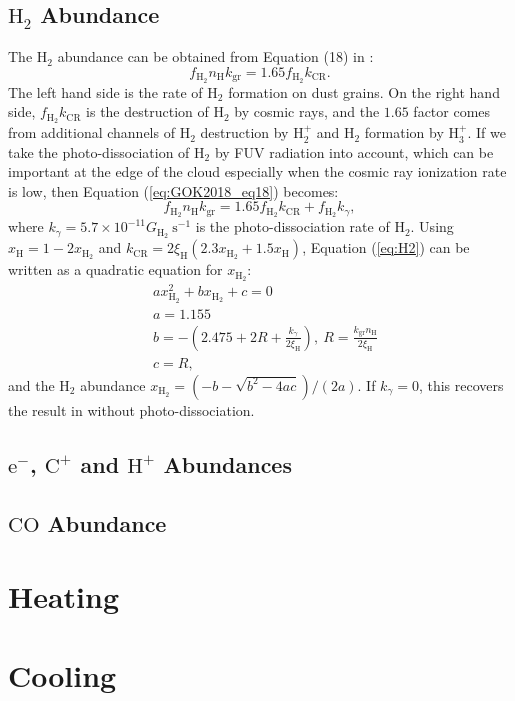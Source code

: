 \documentclass[iop,numberedappendix]{emulateapj}
\newcommand{\mr}{\mathrm}
\newcommand{\Ht}{\mathrm{H_2}}
\newcommand{\Ho}{\mathrm{H}}
\newcommand{\Hplus}{\mathrm{H^+}}
\newcommand{\CO}{\mathrm{CO}}
\newcommand{\Cplus}{\mathrm{C^+}}
\begin{document}
\subsection{$\Ht$ Abundance\label{section:H2}}
The $\Ht$ abundance can be obtained from Equation (18) in \citet{GOK2018}:
\begin{equation}\label{eq:GOK2018_eq18}
    f_\Ht n_\Ho k_\mr{gr} = 1.65 f_\Ht k_\mr{CR}.
\end{equation}
The left hand side is the rate of $\Ht$ formation on dust grains. On the right
hand side, $f_\Ht k_\mr{CR}$ is the destruction of $\Ht$ by cosmic rays, and
the $1.65$ factor comes from additional channels of $\Ht$ destruction by
$\mr{H_2^+}$ and $\Ht$ formation by $\mr{H_3^+}$. If we take the
photo-dissociation of $\Ht$ by FUV radiation into account, which can be
important at the edge of the cloud especially when the cosmic ray ionization
rate is low, then Equation (\ref{eq:GOK2018_eq18}) becomes:
\begin{equation}\label{eq:H2}
    f_\Ht n_\Ho k_\mr{gr} = 1.65 f_\Ht k_\mr{CR} + f_\Ht k_\gamma,
\end{equation}
where $k_\gamma=5.7\times 10^{-11}G_\Ht~\mr{s^{-1}}$ is the photo-dissociation
rate of $\Ht$. Using $x_\Ho = 1-2x_\Ht$ and
$k_\mr{CR}=2\xi_\Ho(2.3x_\Ht+1.5x_\Ho)$, Equation (\ref{eq:H2}) can be written
as a quadratic equation for $x_\Ht$:
\begin{align}
    &a x_\Ht^2 + bx_\Ht + c = 0\\
    &a = 1.155\\
    &b=- (2.475 + 2R + \frac{k_\gamma}{2\xi_\Ho}),
    ~R=\frac{k_\mr{gr}n_\Ho}{2\xi_\Ho}\\
    &c=R,
\end{align}
and the $\Ht$ abundance $x_\Ht=(-b - \sqrt{b^2 - 4ac} )/(2a)$. If $k_\gamma=0$,
this recovers the result in \citet{GOK2018} without photo-dissociation.

\subsection{$\mr{e^{-}}$, $\Cplus$ and $\Hplus$ Abundances\label{section:e}}
\subsection{$\CO$ Abundance\label{section:CO}}

\section{Heating}\label{section:heating}

\section{Cooling}\label{section:cooling}



\end{document}

